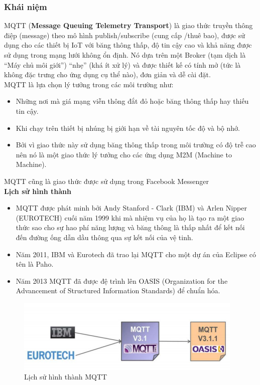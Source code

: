 \subsubsection{Khái niệm}
MQTT (\textbf{Message Queuing Telemetry Transport}) là giao thức truyền thông điệp (message) theo mô hình publish/subscribe (cung cấp /thuê bao), được sử dụng cho các thiết bị IoT với băng thông thấp, độ tin cậy cao và khả năng được sử dụng trong mạng lưới không ổn định. Nó dựa trên một Broker (tạm dịch là “Máy chủ môi giới”) “nhẹ” (khá ít xử lý) và được thiết kế có tính mở (tức là không đặc trưng cho ứng dụng cụ thể nào), đơn giản và dễ cài đặt.\\
\indent MQTT là lựa chọn lý tưởng trong các môi trường như:
\begin{itemize}
	\item Những nơi mà giá mạng viễn thông đắt đỏ hoặc băng thông thấp hay thiếu tin cậy.
	\item Khi chạy trên thiết bị nhúng bị giới hạn về tài nguyên tốc độ và bộ nhớ.
	\item Bởi vì giao thức này sử dụng băng thông thấp trong môi trường có độ trễ cao nên nó là một giao thức lý tưởng cho các ứng dụng M2M (Machine to Machine).
\end{itemize}

\indent MQTT cũng là giao thức được sử dụng trong Facebook Messenger\\
\indent \textbf{Lịch sử hình thành}
\begin{itemize}
	\item MQTT được phát minh bởi Andy Stanford - Clark (IBM) và Arlen Nipper (EUROTECH) cuối năm 1999 khi mà nhiệm vụ của họ là tạo ra một giao thức sao cho sự hao phí năng lượng và băng thông là thấp nhất để kết nối đến đường ống dẫn dầu thông qua sự kết nối của vệ tinh.
	\item Năm 2011, IBM và Eurotech đã trao lại MQTT cho một dự án của Eclipse có tên là Paho.
	\item Năm 2013 MQTT đã được đệ trình lên OASIS (Organization for the Advancement of Structured Information Standards) để chuẩn hóa.
\end{itemize}
\begin{figure}[H]
	\centering
	\includegraphics[scale=.7]{Chapter 2/image chapter 2/lichsuMQTT.png}
	\caption[Lịch sử hình thành MQTT]{Lịch sử hình thành MQTT}
	\label{hinh25}
\end{figure}
